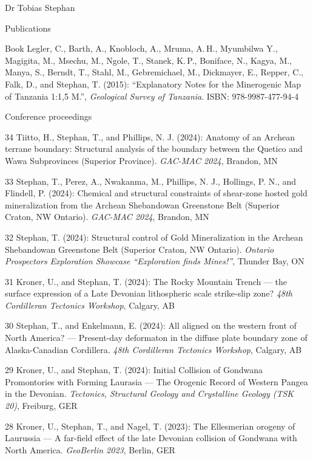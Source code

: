 \documentclass[10pt, paper=letter]{scrartcl} %
\begin{document}
\begin{cv}{Dr Tobias Stephan}
\begin{cvlist}{Publications}
% 
    
    \item[Book] Legler, C., Barth, A., Knobloch, A., Mruma, A.\,H., Myumbilwa Y.,  Magigita, M., Msechu, M., Ngole, T., Stanek, K.\,P., Boniface, N., Kagya, M., Manya, S., Berndt, T., Stahl, M., Gebremichael, M., Dickmayer, E., Repper, C., Falk, D., and Stephan, T. (2015): \enquote{Explanatory Notes for the Minerogenic Map of Tanzania 1:1,5 M.}, \textit{Geological Survey of Tanzania}. ISBN: 978-9987-477-94-4	 
\end{cvlist}



\begin{cvlist}{Conference proceedings} %
    \item[34] Tiitto, H., Stephan, T., and Phillips, N. J. (2024): Anatomy of an Archean terrane boundary: Structural analysis of the boundary between the Quetico and Wawa Subprovinces (Superior Province). \textit{GAC-MAC 2024}, Brandon, MN
    \item[33] Stephan, T., Perez, A., Nwakanma, M., Phillips, N. J., Hollings, P. N., and Flindell, P. (2024): Chemical and structural constraints of shear-zone hosted gold mineralization from the Archean Shebandowan Greenstone Belt (Superior Craton, NW Ontario). \textit{GAC-MAC 2024}, Brandon, MN   
    \item[32] Stephan, T. (2024): Structural control of Gold Mineralization in the Archean Shebandowan Greenstone Belt (Superior Craton, NW Ontario). \textit{Ontario Prospectors Exploration Showcase \enquote{Exploration finds Mines!}}, Thunder Bay, ON   
     \item[31] Kroner, U., and Stephan, T. (2024): The Rocky Mountain Trench --- the surface expression of a Late Devonian lithospheric scale strike-slip zone? \textit{48th Cordilleran Tectonics Workshop}, Calgary, AB
     \item[30] Stephan, T., and Enkelmann, E. (2024): All aligned on the western front of North America? --– Present-day deformaton in the diffuse plate boundary zone of Alaska-Canadian Cordillera. \textit{48th Cordilleran Tectonics Workshop}, Calgary, AB
     \item[29] Kroner, U., and Stephan, T. (2024): Initial Collision of Gondwana Promontories with Forming Laurasia --- The Orogenic Record of Western Pangea in the Devonian. \textit{Tectonics, Structural Geology and Crystalline Geology (TSK 20)}, Freiburg, GER
     \item[28] Kroner, U., Stephan, T., and Nagel, T. (2023): The Ellesmerian orogeny of Laurussia –-- A far-field effect of the late Devonian collision of Gondwana with North America. \textit{GeoBerlin 2023}, Berlin, GER

\end{cvlist}
\end{cv}
\end{document}
